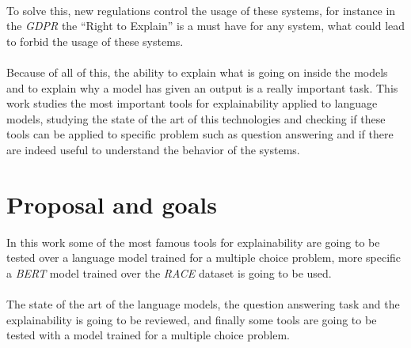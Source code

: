 \paragraph{}
To solve this, new regulations control the usage of these systems, for instance in the \emph{GDPR} the ``Right to Explain'' is a must have for any system, what could lead to forbid the usage of these systems.
\paragraph{}
Because of all of this, the ability to explain what is going on inside the models and to explain why a model has given an output is a really important task. This work studies the most important tools for explainability applied to language models, studying the state of the art of this technologies and checking if these tools can be applied to specific problem such as question answering and if there are indeed useful to understand the behavior of the systems. 
\section{Proposal and goals}
\label{sec:ProposalAndGoals}
\noindent In this work some of the most famous tools for explainability are going to be tested over a language model trained for a multiple choice problem, more specific a \emph{BERT} model trained over the \emph{RACE} dataset is going to be used.
\paragraph{}
The state of the art of the language models, the question answering task and the explainability is going to be reviewed, and finally some tools are going to be tested with a model trained for a multiple choice problem.
